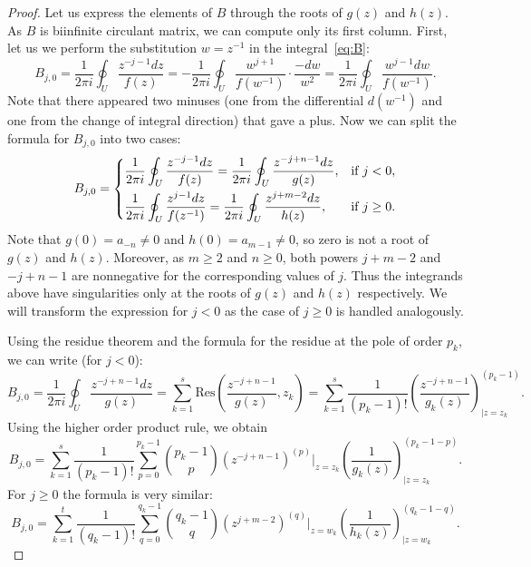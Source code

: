 \documentclass{article}
\begin{document}
	\begin{proof}
	Let us express the elements of $B$ through the roots of $g(z)$ and $h(z)$.
	As $B$ is biinfinite circulant matrix, we can compute only its first column.
	First, let us we perform the substitution $w = z^{-1}$ in the integral~\eqref{eq:B}:
	\[
	B_{j,0}
	=
	\frac{1}{2\pi i} \oint_U \frac{z^{-j-1}dz}{f(z)}
	=
	-\frac{1}{2\pi i} \oint_U \frac{w^{j+1}}{f(w^{-1})}\cdot\frac{-dw}{w^2}
	=
	\frac{1}{2\pi i} \oint_U \frac{w^{j-1}dw}{f(w^{-1})}.
	\]
	Note that there appeared two minuses (one from the differential $d(w^{-1})$ and one from the change of integral direction)  that gave a plus.
	Now we can split the formula for $B_{j,0}$ into two cases:
	\[
	B_{j,0} =
	\begin{dcases}
	\frac{1}{2\pi i} \oint_U\frac{z^{-j-1}dz}{f(z)}
	=
	\frac{1}{2\pi i} \oint_U\frac{z^{-j+n-1}dz}{g(z)}, & \text{if }j < 0, \\
	\frac{1}{2\pi i} \oint_U\frac{z^{j-1}dz}{f(z^{-1})}
	=
	\frac{1}{2\pi i} \oint_U\frac{z^{j+m-2}dz}{h(z)},  & \text{if } j \ge 0.
	\end{dcases}
	\]
	Note that $g(0) = a_{-n} \neq 0$ and $h(0) = a_{m-1} \neq 0$, so zero is not a root of $g(z)$ and $h(z)$.
	Moreover, as $m \ge 2$ and $n \ge 0$, both powers $j + m - 2$ and $-j + n - 1$ are nonnegative for the corresponding values of $j$.
	Thus the integrands above have singularities only at the roots of $g(z)$ and $h(z)$ respectively.
	We will transform the expression for $j < 0$ as the case of $j \ge 0$ is handled analogously.
	
	Using the residue theorem and the formula for the residue at the pole of order $p_k$, we can write (for $j < 0$):
	\[
	B_{j,0} =
	\frac{1}{2\pi i} \oint_U\frac{z^{-j+n-1}dz}{g(z)} = \sum_{k=1}^s \mathrm{Res}\left(\frac{z^{-j+n-1}}{g(z)}, z_k\right) 
	=
	\sum_{k=1}^s\frac{1}{(p_k - 1)!}\left(\frac{z^{-j+n-1}}{g_k(z)}\right)^{(p_k-1)}_{\big|{z=z_k}}.
	\]
	Using the  higher order product rule, we obtain
	\[
	B_{j,0}
	=
	\sum_{k=1}^s\frac{1}{(p_k - 1)!}\sum_{p=0}^{p_k-1}\binom{p_k-1}{p}
	(z^{-j+n-1})^{(p)}|_{z=z_k} \left(\frac{1}{g_k(z)}\right)^{(p_k-1-p)}_{\big|{z=z_k}}.
	\]
	For $j \ge 0$ the formula is very similar:
	\[
	B_{j,0}
	=
	\sum_{k=1}^t\frac{1}{(q_k - 1)!}\sum_{q=0}^{q_k-1}\binom{q_k-1}{q}
	(z^{j+m-2})^{(q)}|_{z=w_k} \left(\frac{1}{h_k(z)}\right)^{(q_k-1-q)}_{\big|{z=w_k}}.
	\]
	

\end{proof}
\end{document}
